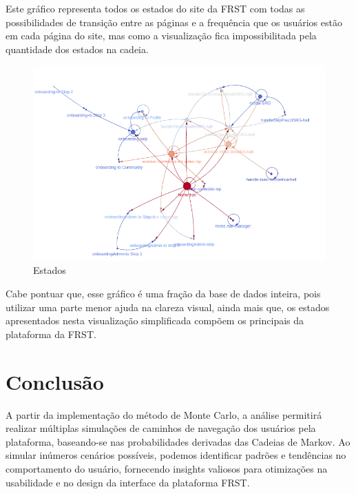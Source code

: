 Este gráfico representa todos os estados do site da FRST com todas as possibilidades de transição entre as páginas e a frequência que os usuários estão em cada página do site, mas como a visualização fica impossibilitada pela quantidade dos estados na cadeia.

\begin{figure}
    \centering
    \includegraphics[width = .9\linewidth]{relatorios/frst/figuras/estados2.png}
        \caption{Estados}

    \label{fig:mapa3}
\end{figure}

Cabe pontuar que, esse gráfico é uma fração da base de dados inteira, pois utilizar uma parte menor ajuda na clareza visual, ainda mais que, os estados apresentados nesta visualização simplificada compõem os principais da plataforma da FRST.

\section{Conclusão}


A partir da implementação do método de Monte Carlo, a análise permitirá realizar múltiplas simulações de caminhos de navegação dos usuários pela plataforma, baseando-se nas probabilidades derivadas das Cadeias de Markov. Ao simular inúmeros cenários possíveis, podemos identificar padrões e tendências no comportamento do usuário, fornecendo insights valiosos para otimizações na usabilidade e no design da interface da plataforma FRST.
